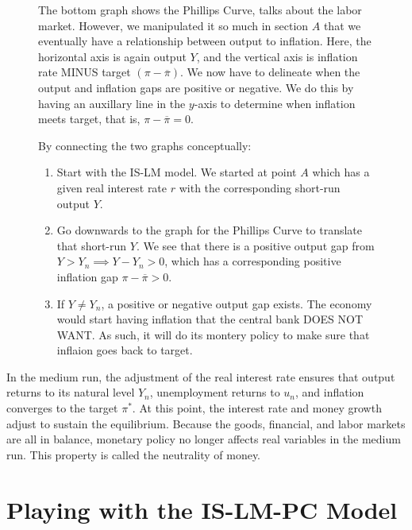 \documentclass{extarticle}
\begin{document}
\begin{figure}[H]
\begin{minipage}{0.6\linewidth}
    \vspace{2mm}

    The bottom graph shows the Phillips Curve, talks about the labor market. However, we manipulated it so much in section $A$ that we eventually have a relationship between output to inflation. 
    Here, the horizontal axis is again output $Y$, and the vertical axis is inflation rate MINUS target $(\pi - \overline{\pi})$. We now have to delineate when the output and inflation gaps are positive or negative. We do this by having an auxillary line in the $y$-axis to determine when inflation meets target, that is, $\pi - \overline{\pi} = 0$.
    
    \vspace{2mm}
    By connecting the two graphs conceptually:
    \begin{enumerate}
        \item Start with the IS-LM model. We started at point $A$ which has a given real interest rate $r$ with the corresponding short-run output $Y$.
        \item Go downwards to the graph for the Phillips Curve to translate that short-run $Y$. We see that there is a positive output gap from $Y > Y_n \implies Y - Y_n > 0$, which has a corresponding positive inflation gap $\pi - \overline{\pi} > 0$.
        \item If $Y \neq Y_n$, a positive or negative output gap exists. The economy would start having inflation that the central bank DOES NOT WANT. As such, it will do its montery policy to make sure that inflaion goes back to target.
    \end{enumerate}
  \end{minipage} 
\end{figure}

In the medium run, the adjustment of the real interest rate ensures that output returns to its natural level $Y_n$, unemployment returns to $u_n$, and inflation converges to the target $\pi^*$. 
At this point, the interest rate and money growth adjust to sustain the equilibrium. Because the goods, financial, and labor markets are all in balance, monetary policy no longer affects real variables in the medium run. This property is called the neutrality of money.


\section{Playing with the IS-LM-PC Model}
\end{document}
